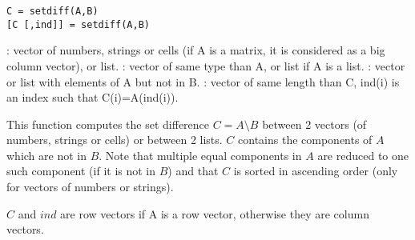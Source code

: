 
\begin{mandesc}
\end{mandesc}

\begin{calling_sequence}
\begin{verbatim}
C = setdiff(A,B)
[C [,ind]] = setdiff(A,B)
\end{verbatim}
\end{calling_sequence}
\begin{parameters}
  \begin{varlist}
     : vector of numbers, strings or cells (if A is a matrix, it is
    considered as a big column vector), or list.
     : vector of same type than A, or list if A is a list. 
     : vector or list with elements of A but not in B.
     : vector of same length than C, ind(i) is an index
                  such that C(i)=A(ind(i)).
  \end{varlist}
\end{parameters}

\begin{mandescription}
  This function computes the set difference $C = A \setminus B$
  between 2 vectors (of numbers, strings or cells) or between 2
  lists. $C$ contains the components
  of $A$ which are not in $B$. Note that multiple equal components in
  $A$ are reduced to one such component (if it is not in $B$) and that
  $C$ is sorted in ascending order (only for vectors of numbers or strings).

  $C$ and $ind$ are row vectors if  A is a row vector, otherwise they
  are column vectors.
  
\end{mandescription}

